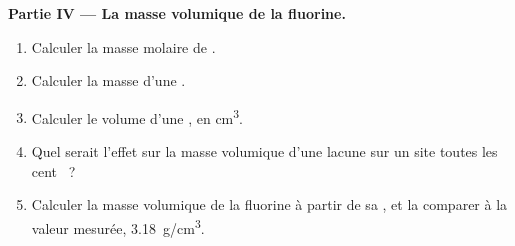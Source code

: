 \begin{problem}
\medskip
\noindent\textbf{Partie IV --- La masse volumique de la fluorine.}
\begin{enumerate}[resume]
  \item Calculer la masse molaire de .
  \item Calculer la masse d'une .
  \item Calculer le volume d'une , en \unit{cm^3}.
  \item Quel serait l'effet sur la masse volumique d'une lacune sur un
        site  toutes les cent ~?
  \item Calculer la masse volumique de la fluorine à partir de sa
        , et la comparer à la valeur mesurée, \qty{3.18}{g/cm^3}.
\end{enumerate}
\end{problem}
